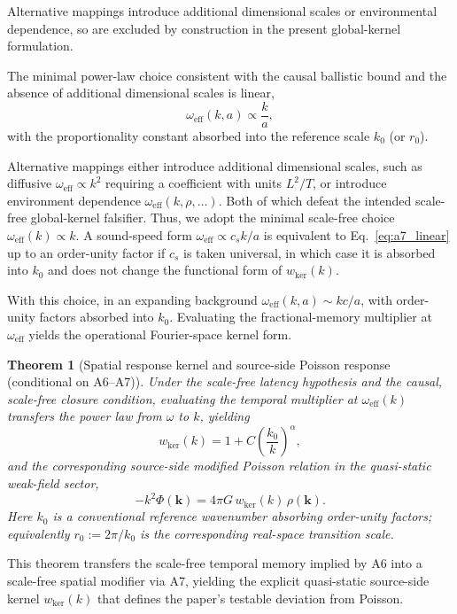 \documentclass[entropy,article,submit,pdftex,moreauthors]{Definitions/mdpi}
\newtheorem{theoremX}{Theorem}[section]
\begin{document}
Alternative mappings introduce additional dimensional scales or environmental dependence, so are excluded by construction in the present global-kernel formulation.

The minimal power-law choice consistent with the causal ballistic bound and the absence of additional dimensional scales is linear,
\begin{equation}
  \omega_{\mathrm{eff}}(k,a) \propto \frac{k}{a},
  \label{eq:a7_linear}
\end{equation}
with the proportionality constant absorbed into the reference scale \(k_0\) (or \(r_0\)).

Alternative mappings either introduce additional dimensional scales, such as diffusive $\omega_{\mathrm{eff}}\propto k^2$ requiring a coefficient with units $L^2/T$, or introduce environment dependence $\omega_{\mathrm{eff}}(k,\rho,\ldots)$. Both of which defeat the intended scale-free global-kernel falsifier. Thus, we adopt the minimal scale-free choice $\omega_{\mathrm{eff}}(k)\propto k$. A sound-speed form $\omega_{\mathrm{eff}}\propto c_s k/a$ is equivalent to Eq.~\eqref{eq:a7_linear} up to an order-unity factor if $c_s$ is taken universal, in which case it is absorbed into $k_0$ and does not change the functional form of $w_{\mathrm{ker}}(k)$.

With this choice, in an expanding background \(\omega_{\mathrm{eff}}(k,a)\sim kc/a\), with order-unity factors absorbed into \(k_0\).
Evaluating the fractional-memory multiplier at \(\omega_{\mathrm{eff}}\) yields the operational Fourier-space kernel form.

\begin{theoremX}[Spatial response kernel and source-side Poisson response (conditional on A6--A7)]
\label{dr:wk}
Under the scale-free latency hypothesis and the causal, scale-free closure condition, evaluating the temporal multiplier at \(\omega_{\mathrm{eff}}(k)\) transfers the power law from \(\omega\) to \(k\), yielding
\begin{equation}
  w_{\mathrm{ker}}(k)=1+C\left(\frac{k_0}{k}\right)^{\alpha},
  \label{eq:wk}
\end{equation}
and the corresponding source-side modified Poisson relation in the quasi-static weak-field sector,
\begin{equation}
  -k^2\Phi(\mathbf{k}) = 4\pi G\,w_{\mathrm{ker}}(k)\,\rho(\mathbf{k}).
  \label{eq:poisson_k}
\end{equation}
Here \(k_0\) is a conventional reference wavenumber absorbing order-unity factors; equivalently \(r_0:=2\pi/k_0\) is the corresponding real-space transition scale.
\end{theoremX}
This theorem transfers the scale-free temporal memory implied by A6 into a scale-free spatial modifier via A7, yielding the explicit quasi-static source-side kernel $w_{\mathrm{ker}}(k)$ that defines the paper’s testable deviation from Poisson.
\end{document}
